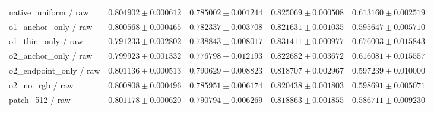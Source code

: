 \documentclass[jimaging,article,submit,pdftex,moreauthors]{Definitions/mdpi}
\begin{document}
\begin{longtable}{@{}>{\raggedright\arraybackslash}p{5.0cm}>{\raggedright\arraybackslash}p{2.5cm}>{\raggedright\arraybackslash}p{2.5cm}>{\raggedright\arraybackslash}p{2.5cm}>{\raggedright\arraybackslash}p{2.5cm}@{}}
native\_uniform / raw & $0.804902\pm 0.000612$ & $0.785002\pm 0.001244$ & $0.825069\pm 0.000508$ & $0.613160\pm 0.002519$\\
o1\_anchor\_only / raw & $0.800568\pm 0.000465$ & $0.782337\pm 0.003708$ & $0.821631\pm 0.001035$ & $0.595647\pm 0.005710$\\
o1\_thin\_only / raw & $0.791233\pm 0.002802$ & $0.738843\pm 0.008017$ & $0.831411\pm 0.000977$ & $0.676003\pm 0.015843$\\
o2\_anchor\_only / raw & $0.799923\pm 0.001332$ & $0.776798\pm 0.012193$ & $0.822682\pm 0.003672$ & $0.616081\pm 0.015557$\\
o2\_endpoint\_only / raw & $0.801136\pm 0.000513$ & $0.790629\pm 0.008823$ & $0.818707\pm 0.002967$ & $0.597239\pm 0.010000$\\
o2\_no\_rgb / raw & $0.800808\pm 0.000496$ & $0.785951\pm 0.006174$ & $0.820438\pm 0.001803$ & $0.598691\pm 0.005071$\\
patch\_512 / raw & $0.801178\pm 0.000620$ & $0.790794\pm 0.006269$ & $0.818863\pm 0.001855$ & $0.586711\pm 0.009230$\\
\end{longtable}\endgroup
\end{document}
